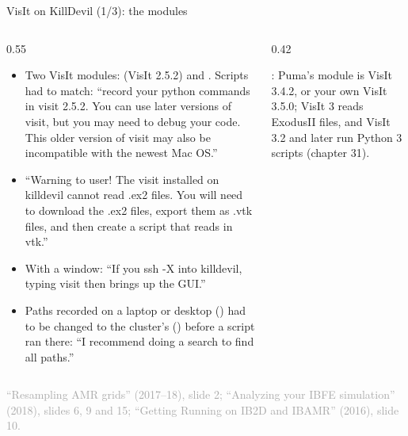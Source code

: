 \documentclass[aspectratio=169,11pt]{beamer}
\newcommand{\sourcecredit}[1]{\vfill\begin{flushright}\tiny\textcolor{DarkGray}{#1}\end{flushright}}
\begin{document}
\begin{frame}{VisIt on KillDevil (1/3): the modules}
\label{fr:visitkd}
\begin{columns}[T,onlytextwidth]
\begin{column}{0.55\textwidth}
\footnotesize
\begin{itemize}\setlength{\itemsep}{2pt}
  \item Two VisIt modules:  (VisIt 2.5.2) and . Scripts had to match: ``record your python commands in visit 2.5.2. You can use later versions of visit, but you may need to debug your code. This older version of visit may also be incompatible with the newest Mac OS.''
  \item ``Warning to user! The visit installed on killdevil cannot read .ex2 files. You will need to download the .ex2 files, export them as .vtk files, and then create a script that reads in vtk.''
  \item With a window: ``If you ssh -X into killdevil, typing visit then brings up the GUI.''
  \item Paths recorded on a laptop or desktop () had to be changed to the cluster's () before a script ran there: ``I recommend doing a search to find all paths.''
\end{itemize}
\end{column}
\begin{column}{0.42\textwidth}
\begin{punchbox}
\small {}: Puma's  module is VisIt 3.4.2, or your own VisIt 3.5.0; VisIt 3 reads ExodusII files, and VisIt 3.2 and later run Python 3 scripts (chapter 31).
\end{punchbox}
\end{column}
\end{columns}
\sourcecredit{``Resampling AMR grids'' (2017--18), slide 2; ``Analyzing your IBFE simulation'' (2018), slides 6, 9 and 15; ``Getting Running on IB2D and IBAMR'' (2016), slide 10.}
\end{frame}
\end{document}
